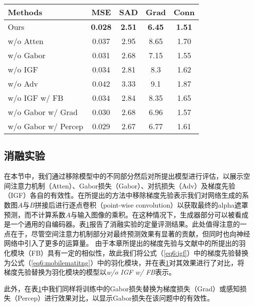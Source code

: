 \begin{table}[t]
	\setlength{\tabcolsep}{8pt}
	\centering
	\begin{tabular}{lcccc}
		\toprule
		Methods & MSE & SAD & Grad &Conn\\
		\midrule
		Ours & \textbf{0.028} & \textbf{2.51} & \textbf{6.45} & \textbf{1.51}\\    
		w/o Atten & 0.037 & 2.95& 8.65 & 1.70\\
		w/o Gabor & 0.031 & 2.68 & 7.15 & 1.55\\
		w/o IGF & 0.034 & 2.81 & 8.3 & 1.62\\
		w/o Adv & 0.042 & 3.33 & 9.1 & 1.87\\
		w/o IGF w/ FB  & 0.034 & 2.84 & 8.35 & 1.65\\
		w/o Gabor w/ Grad & 0.030 & 2.68 & 6.96 & 1.57\\
		w/o Gabor w/ Percep & 0.029 & 2.67 & 6.77 & 1.61\\
		\bottomrule
	\end{tabular}
	\label{tab6:ablation}
\end{table}
\subsection{消融实验}
在本节中，我们通过移除模型中的不同部分然后对所提出模型进行评估，以展示空间注意力机制（Atten）、Gabor损失（Gabor）、对抗损失（Adv）及梯度先验（IGF）各自的有效性。在所提出的方法中移除梯度先验表示我们对网络生成的系数图$A$与$B$拼接后进行逐点卷积（point-wise convolution）以获取最终的alpha遮罩预测，而不计算系数$A$与输入图像的乘积。在这种情况下，生成器部分可以被看成是一个通用的自编码器。表\ref{tab6:ablation}报告了消融实验的定量评测结果。此处值得注意的一点在于，尽管空间注意力机制部分对最终预测效果有显著的贡献，但同时也向神经网络中引入了更多的运算量。
由于本章所提出的梯度先验与文献\parencite{zhu2017fast}中的所提出的羽化模块（FB）具有一定的相似性，故此我们将公式（\ref{eq6:igf}）中的梯度先验替换为公式（\ref{eq6:mobilematitng}）中的羽化模块，并在表\ref{tab6:ablation}对其效果进行了对比，将梯度先验替换为羽化模块的模型以\textit{w/o IGF w/ FB}表示。

此外，在表\ref{tab6:ablation}中我们同样将训练中的Gabor损失替换为梯度损失（Grad）或感知损失（Percep）进行效果对比，以显示Gabor损失在该问题中的有效性。

